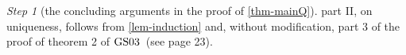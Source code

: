 \documentclass[ecta,nameyear,draft]{econsocart}
\makeatletter
\newcommand{\countof}{\mathbin{\#}\hskip1pt}
\newcommand{\R}{\mathbb R}
\newcommand{\mc}{\mathcal}
\newcommand\mplus{\text{\srcsize$+$}}
\newcommand{\spann}{\operatorname{span}}
\newcommand{\aext}{\mathrel{\acute{\mathrel{\mathcal R}}}}
\newcommand{\mbbt}{{\mathds {T}}}
\newcommand{\mbbtpp}{{\mathfrak{T}}}
\newcommand{\mbbj}{\mathds J}
\newcommand{\mbbjpp}{\mathfrak{I}}
\newcommand{\xy}{{(x, y)}}
\newcommand{\dd}{{(\cdot,\cdot)}}
\DeclareMathOperator{\ess}{ess}
\newcommand\Wlog{W\@.l\@.o\@.g\@ifnextchar.{}{.\@}}
\newcommand{\srcsize}{\@setfontsize{\srcsize}{3pt}{3pt}}
\newcommand{\gsii}{$\textup{GS03}$}
\theoremstyle{plain}
\theoremstyle{remark}
\newtheorem{step}{Step}[section]
\makeatother
\begin{document}
\begin{appendix}
\begin{step}[the concluding arguments in the proof of \cref{thm-mainQ}]
     part II, on uniqueness, follows from \cref{lem-induction}
    and, without modification, part 3 of the proof of theorem 2 of \gsii\ (see
    page 23).
  \end{step}
  

\end{appendix}
\end{document}

